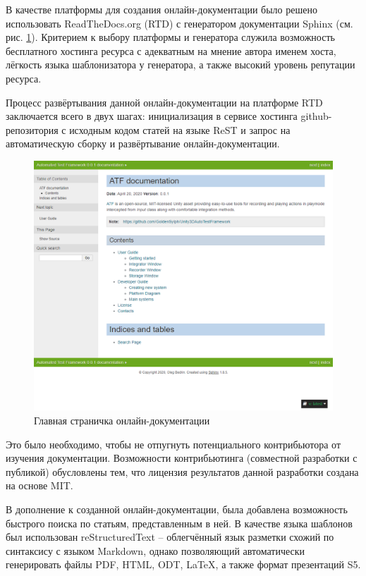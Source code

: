 В качестве платформы для создания онлайн-документации было решено использовать ReadTheDocs.org (RTD) с генератором документации Sphinx (см. рис. \ref{online_docs}). Критерием к выбору платформы и генератора служила возможность бесплатного хостинга ресурса с адекватным на мнение автора именем хоста, лёгкость языка шаблонизатора у генератора, а также высокий уровень репутации ресурса.

Процесс развёртывания данной онлайн-документации на платформе RTD заключается всего в двух шагах: инициализация в сервисе хостинга github-репозитория с исходным кодом статей на языке ReST и запрос на автоматическую сборку и развёртывание онлайн-документации.

\begin{figure}[H]
	\centering
	\includegraphics[width=\linewidth]{online_docs.png}
	\caption{Главная страничка онлайн-документации}
	\label{online_docs}
\end{figure}

Это было необходимо, чтобы не отпугнуть потенциального контрибьютора от изучения документации. Возможности контрибьютинга (совместной разработки с публикой) обусловлены тем, что лицензия результатов данной разработки создана на основе MIT.

В дополнение к созданной онлайн-документации, была добавлена возможность быстрого поиска по статьям, представленным в ней. В качестве языка шаблонов был использован reStructuredText -- облегчённый язык разметки схожий по синтаксису с языком Markdown, однако позволяющий автоматически генерировать файлы PDF, HTML, ODT, LaTeX, а также формат презентаций S5.

